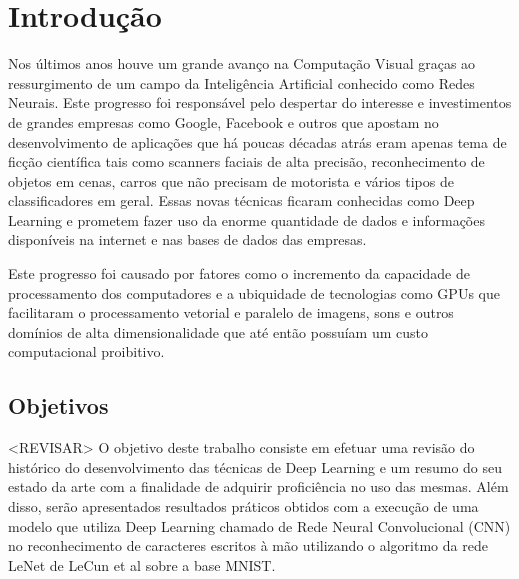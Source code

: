 \chapter{Introdução}

Nos últimos anos houve um grande avanço na Computação Visual graças ao
ressurgimento de um campo da Inteligência Artificial conhecido como Redes
Neurais. Este progresso foi responsável pelo despertar do interesse e
investimentos de grandes empresas como Google, Facebook e outros que apostam no
desenvolvimento de aplicações que há poucas décadas atrás eram apenas tema de
ficção científica tais como scanners faciais de alta precisão, reconhecimento
de objetos em cenas, carros que não precisam de motorista e vários tipos de
classificadores em geral. Essas novas técnicas ficaram conhecidas como Deep
Learning e prometem fazer uso da enorme quantidade de dados e informações
disponíveis na internet e nas bases de dados das empresas.

Este progresso foi causado por fatores como o incremento da capacidade de
processamento dos computadores e a ubiquidade de tecnologias como GPUs que
facilitaram o processamento vetorial e paralelo de imagens, sons e outros
domínios de alta dimensionalidade que até então possuíam um custo computacional
proibitivo.

\section{Objetivos}

<REVISAR>
O objetivo deste trabalho consiste em efetuar uma revisão do
histórico do desenvolvimento das técnicas de Deep Learning e um resumo do seu
estado da arte com a finalidade de adquirir proficiência no uso das mesmas.
Além disso, serão apresentados resultados práticos obtidos com a execução de
uma modelo que utiliza Deep Learning chamado de Rede Neural Convolucional
(CNN) no reconhecimento de caracteres escritos à mão utilizando o algoritmo da
rede LeNet de LeCun et al sobre a base MNIST.\@

